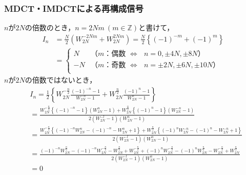 \documentclass[14pt,xcolor=dvipsnames,table,dvipdfmx]{beamer}
\begin{document}
\begin{frame}[c]
    \frametitle{MDCT・IMDCTによる再構成信号}
    \scriptsize
    $n$が$2N$の倍数のとき，$n = 2Nm\ (m \in \mathbb{Z})$と書けて，
    \begin{align*}
        I_{n} &= \frac{N}{2} \left( W_{2N}^{-2Nm} + W_{2N}^{2Nm} \right) = \frac{N}{2} \left\{ (-1)^{-m} + (-1)^{m} \right\} \\
        &= \left\{ \begin{array}{ll}
            N & \text{（$m$：偶数 $\iff$ $n = 0, \pm 4N, \pm 8N$）} \\
            -N & \text{（$m$：奇数 $\iff$ $n = \pm 2N, \pm 6N, \pm 10N$）} \\
        \end{array} \right.
    \end{align*}
    $n$が$2N$の倍数ではないとき，
    \begin{align*}
        & I_{n} = \frac{1}{2}
        \left\{
        W_{2N}^{-\frac{n}{2}} \frac{(-1)^{-n} - 1}{W_{2N}^{-n} - 1} + W_{2N}^{\frac{n}{2}} \frac{(-1)^{n} - 1}{W_{2N}^{n} - 1}
        \right\} \\
        &= \frac{ W_{2N}^{-\frac{n}{2}} \left\{ (-1)^{-n} - 1 \right\} ( W_{2N}^{n} - 1 ) +  W_{2N}^{\frac{n}{2}} \left\{ (-1)^{n} - 1 \right\} ( W_{2N}^{-n} - 1 ) }{2( W_{2N}^{-l} - 1 )( W_{2N}^{n} - 1 )} \\
        &= \frac{ W_{2N}^{-\frac{n}{2}} \left\{ (-1)^{-n} W_{2N}^{n} - (-1)^{-n} - W_{2N}^{n} + 1 \right\} + W_{2N}^{\frac{n}{2}} \left\{ (-1)^{n} W_{2N}^{-n} - (-1)^{n} - W_{2N}^{-n} + 1 \right\}}{2( W_{2N}^{-l} - 1 )( W_{2N}^{n} - 1 )} \\
        &= \frac{ (-1)^{-n} W_{2N}^{\frac{n}{2}} - (-1)^{-n} W_{2N}^{-\frac{n}{2}} - W_{2N}^{\frac{n}{2}} + W_{2N}^{-\frac{n}{2}} + (-1)^{n} W_{2N}^{-\frac{n}{2}} - (-1)^{n} W_{2N}^{\frac{n}{2}} - W_{2N}^{-\frac{n}{2}} + W_{2N}^{\frac{n}{2}}}{2( W_{2N}^{-l} - 1 )( W_{2N}^{n} - 1 )} \\
        &= 0
    \end{align*}
\end{frame}
\end{document}

